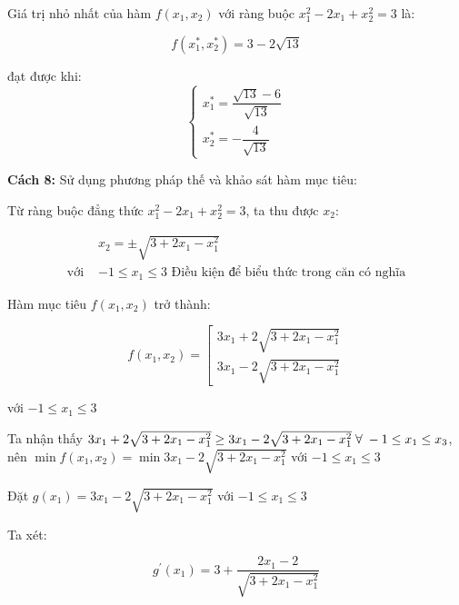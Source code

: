 \documentclass[14pt, a4paper]{article}
\theoremstyle{sltheorem}
\theoremstyle{soltheorem}
\begin{document}
    Giá trị nhỏ nhất của hàm $f(x_1, x_2)$ với ràng buộc $x_1^2 - 2x_1 + x_2^2 = 3$ là:

    \begin{equation*}
        f(x_1^*, x_2^*) = 3 - 2\sqrt{13}
    \end{equation*}

    đạt được khi:
    \begin{equation*}
        \begin{cases} 
            x_1^* = \dfrac{\sqrt{13} - 6}{\sqrt{13}} \\ 
            x_2^* = - \dfrac{4}{\sqrt{13}} 
        \end{cases}
    \end{equation*}

    \textbf{Cách 8:} Sử dụng phương pháp thế và khảo sát hàm mục tiêu:

    Từ ràng buộc đẳng thức $x_1^2 - 2x_1 + x_2^2 = 3$, ta thu được $x_2$:

    \begin{equation*}
        \begin{aligned}
            &x_2 = \pm \sqrt{3 + 2x_1 - x_1^2} \\
            \text{với }& -1 \leq x_1 \leq 3 \text{ Điều kiện để biểu thức trong căn có nghĩa}
        \end{aligned}
    \end{equation*}

    Hàm mục tiêu $f(x_1, x_2)$ trở thành:

    \begin{equation*}
        f(x_1, x_2) = \left [\begin{array}{l} 3x_1 + 2\sqrt{3 + 2x_1 - x_1^2} \\ 3x_1 - 2\sqrt{3 + 2x_1 - x_1^2} \end{array} \right.
    \end{equation*}

    với $-1 \leq x_1 \leq 3$

    Ta nhận thấy $3x_1 + 2\sqrt{3 + 2x_1 - x_1^2} \geq 3x_1 - 2\sqrt{3 + 2x_1 - x_1^2} \thickspace \forall \thickspace -1 \leq x_1 \leq x_3$,
    nên $\min f(x_1, x_2) = \min 3x_1 - 2\sqrt{3 + 2x_1 - x_1^2} $ với $-1 \leq x_1 \leq 3$

    Đặt $g(x_1) = 3x_1 - 2\sqrt{3 + 2x_1 - x_1^2}$ với $-1 \leq x_1 \leq 3$

    Ta xét:

    \begin{equation*}
        g^{\prime}(x_1) = 3 + \dfrac{2 x_1 - 2}{\sqrt{3 + 2x_1 - x_1^2}}
    \end{equation*}
\end{document}
